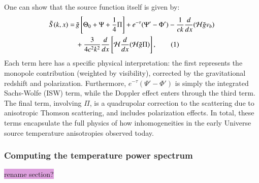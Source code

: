 \documentclass{aa}
\newcommand\numberthis{\addtocounter{equation}{1}\tag{\theequation}}
\numberwithin{equation}{section}
\numberwithin{table}{section}
\numberwithin{figure}{section}
\begin{document}
One can show that the source function itself is given by:
\begin{align*}
\tilde{S}(k, x) =\, &\tilde{g} \left[ \Theta_0 + \Psi + \frac{1}{4} \Pi \right] + e^{-\tau} (\Psi' - \Phi') - \frac{1}{ck} \frac{d}{dx}(\mathcal{H} \tilde{g} v_b) \\
&+ \frac{3}{4 c^2 k^2} \frac{d}{dx} \left[ \mathcal{H} \frac{d}{dx} (\mathcal{H} \tilde{g} \Pi) \right], \numberthis
\end{align*}
Each term here has a specific physical interpretation: the first represents the monopole contribution (weighted by visibility), corrected by the gravitational redshift and polarization. Furthermore, $e^{-\tau}(\Psi' - \Phi')$ is simply the integrated Sachs-Wolfe (ISW) term, while the Doppler effect enters through the third term. The final term, involving $\Pi$, is a quadrupolar correction to the scattering due to anisotropic Thomson scattering, and includes polarization effects. In total, these terms encapsulate the full physics of how inhomogeneities in the early Universe source temperature anisotropies observed today. 





\subsubsection{Computing the temperature power spectrum}\label{subsubsec: IV theory CMB}
\colorbox{Plum}{rename section?}
\end{document}
